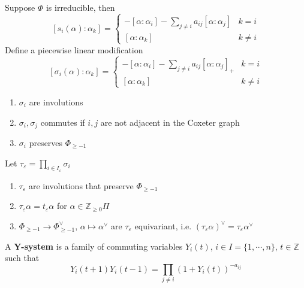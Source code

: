 \documentclass[main]{subfiles}
\begin{document}
\begin{definition}
Suppose $\Phi$ is irreducible, then
\[[s_i(\alpha):\alpha_k]=\begin{cases}
-[\alpha:\alpha_i]-\displaystyle\sum_{j\neq i}a_{ij}[\alpha:\alpha_j]&k=i \\
[\alpha:\alpha_k]&k\neq i
\end{cases}\]
Define a piecewise linear modification
\[[\sigma_i(\alpha):\alpha_k]=\begin{cases}
-[\alpha:\alpha_i]-\displaystyle\sum_{j\neq i}a_{ij}[\alpha:\alpha_j]_+&k=i \\
[\alpha:\alpha_k]&k\neq i
\end{cases}\]
\end{definition}

\begin{proposition}\hfill
\begin{enumerate}[leftmargin=*,label=\textbf{\arabic*.}]
\item $\sigma_i$ are involutions
\item $\sigma_i,\sigma_j$ commutes if $i,j$ are not adjacent in the Coxeter graph
\item $\sigma_i$ preserves $\Phi_{\geq-1}$
\end{enumerate}
\end{proposition}

\begin{proposition}
Let $\tau_\varepsilon=\displaystyle\prod_{i\in I_\varepsilon}\sigma_i$
\begin{enumerate}[leftmargin=*,label=\textbf{\arabic*.}]
\item $\tau_\varepsilon$ are involutions that preserve $\Phi_{\geq -1}$
\item $\tau_\varepsilon\alpha=t_\varepsilon\alpha$ for $\alpha\in\mathbb Z_{\geq0}\Pi$
\item $\Phi_{\geq-1}\to\Phi_{\geq-1}^\vee$, $\alpha\mapsto\alpha^\vee$ are $\tau_\varepsilon$ equivariant, i.e. $(\tau_\varepsilon\alpha)^\vee=\tau_\varepsilon\alpha^\vee$
\end{enumerate}
\end{proposition}

\begin{definition}
A \textbf{Y-system} is a family of commuting variables $Y_i(t)$, $i\in I=\{1,\cdots,n\}$, $t\in\mathbb Z$ such that
\begin{equation}\label{Y-system}
Y_{i}(t+1)Y_{i}(t-1)=\prod_{j\neq i}(1+Y_i(t))^{-a_{ij}}
\end{equation}
\end{definition}
\end{document}
